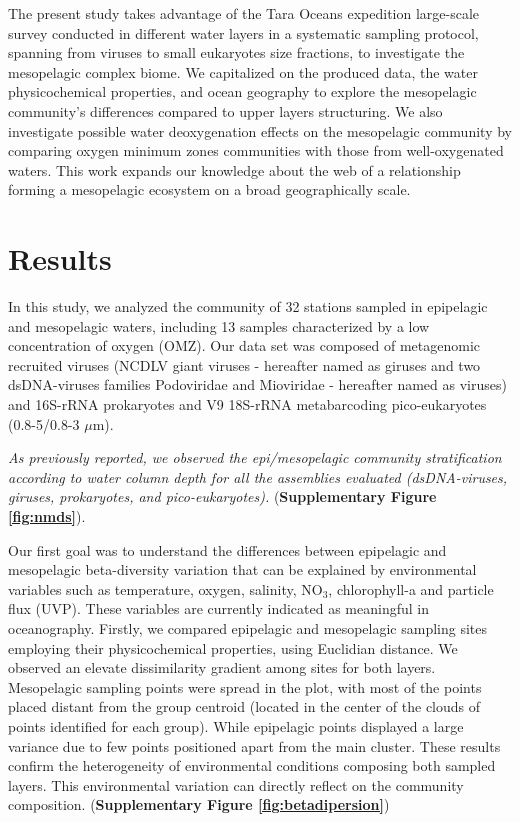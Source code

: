\documentclass[fleqn,10pt]{wlscirep}
\begin{document}
The present study takes advantage of the Tara Oceans expedition large-scale survey conducted in different water layers in a systematic sampling protocol, spanning from viruses to small eukaryotes size fractions, to investigate the mesopelagic complex biome. We capitalized on the produced data, the water physicochemical properties, and ocean geography to explore the mesopelagic community's differences compared to upper layers structuring. We also investigate possible water deoxygenation effects on the mesopelagic community by comparing oxygen minimum zones communities with those from well-oxygenated waters. This work expands our knowledge about the web of a relationship forming a mesopelagic ecosystem on a broad geographically scale.

\section*{Results}

In this study, we analyzed the community of 32 stations sampled in epipelagic and mesopelagic waters, including 13 samples characterized by a low concentration of oxygen (OMZ). Our data set was composed of metagenomic recruited viruses (NCDLV giant viruses - hereafter named as giruses and two dsDNA-viruses families Podoviridae and Mioviridae - hereafter named as viruses) and 16S-rRNA prokaryotes and V9 18S-rRNA metabarcoding pico-eukaryotes (0.8-5/0.8-3 $\mu$m).

\textit{As previously reported, we observed the epi/mesopelagic community stratification according to water column depth for all the assemblies evaluated (dsDNA-viruses, giruses, prokaryotes, and pico-eukaryotes).}  (\textbf{Supplementary Figure \ref{fig:nmds}}). %

Our first goal was to understand the differences between epipelagic and mesopelagic beta-diversity variation that can be explained by environmental variables such as temperature, oxygen, salinity, NO$_3$, chlorophyll-a and particle flux (UVP). These variables are currently indicated as meaningful in oceanography. Firstly, we compared epipelagic and mesopelagic sampling sites employing their physicochemical properties, using Euclidian distance. We observed an elevate dissimilarity gradient among sites for both layers. Mesopelagic sampling points were spread in the plot, with most of the points placed distant from the group centroid (located in the center of the clouds of points identified for each group). While epipelagic points displayed a large variance due to few points positioned apart from the main cluster. %
These results confirm the heterogeneity of environmental conditions composing both sampled layers. This environmental variation can directly reflect on the community composition.  (\textbf{Supplementary Figure \ref{fig:betadipersion}})
\end{document}
